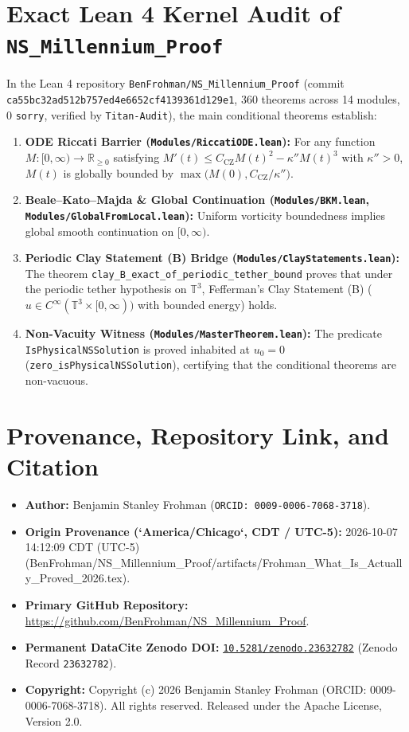 \documentclass[11pt,letterpaper]{article}
\begin{document}
\section{Exact Lean 4 Kernel Audit of \texttt{NS\_Millennium\_Proof}}
In the Lean 4 repository \texttt{BenFrohman/NS\_Millennium\_Proof} (commit \texttt{ca55bc32ad512b757ed4e6652cf4139361d129e1}, 360 theorems across 14 modules, 0 \texttt{sorry}, verified by \texttt{Titan-Audit}), the main conditional theorems establish:
\begin{enumerate}[leftmargin=2em]
  \item \textbf{ODE Riccati Barrier (\texttt{Modules/RiccatiODE.lean}):} For any function $M : [0,\infty) \to \mathbb{R}_{\ge 0}$ satisfying $M'(t) \le C_{\mathrm{CZ}} M(t)^2 - \kappa'' M(t)^3$ with $\kappa'' > 0$, $M(t)$ is globally bounded by $\max\bigl(M(0), C_{\mathrm{CZ}}/\kappa''\bigr)$.
  \item \textbf{Beale--Kato--Majda \& Global Continuation (\texttt{Modules/BKM.lean}, \texttt{Modules/GlobalFromLocal.lean}):} Uniform vorticity boundedness implies global smooth continuation on $[0,\infty)$.
  \item \textbf{Periodic Clay Statement (B) Bridge (\texttt{Modules/ClayStatements.lean}):} The theorem \texttt{clay\_B\_exact\_of\_periodic\_tether\_bound} proves that under the periodic tether hypothesis on $\mathbb{T}^3$, Fefferman's Clay Statement (B) ($u \in C^\infty(\mathbb{T}^3 \times [0,\infty))$ with bounded energy) holds.
  \item \textbf{Non-Vacuity Witness (\texttt{Modules/MasterTheorem.lean}):} The predicate \texttt{IsPhysicalNSSolution} is proved inhabited at $u_0 = 0$ (\texttt{zero\_isPhysicalNSSolution}), certifying that the conditional theorems are non-vacuous.
\end{enumerate}


\section*{Provenance, Repository Link, and Citation}
\begin{itemize}[leftmargin=2em]
  \item \textbf{Author:} Benjamin Stanley Frohman (\texttt{ORCID: 0009-0006-7068-3718}).
  \item \textbf{Origin Provenance (`America/Chicago`, CDT / UTC-5):} 2026-10-07 14:12:09 CDT (UTC-5) (BenFrohman/NS\_Millennium\_Proof/artifacts/Frohman\_What\_Is\_Actually\_Proved\_2026.tex).
  \item \textbf{Primary GitHub Repository:} \url{https://github.com/BenFrohman/NS_Millennium_Proof}.
  \item \textbf{Permanent DataCite Zenodo DOI:} \href{https://doi.org/10.5281/zenodo.23632782}{\texttt{10.5281/zenodo.23632782}} (Zenodo Record \texttt{23632782}).
  \item \textbf{Copyright:} Copyright (c) 2026 Benjamin Stanley Frohman (ORCID: 0009-0006-7068-3718). All rights reserved. Released under the Apache License, Version 2.0.
\end{itemize}
\end{document}
